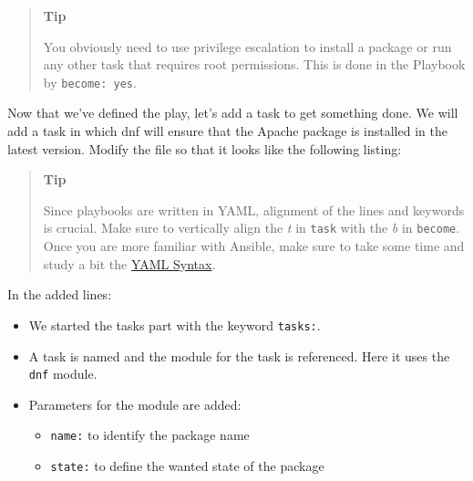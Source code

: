 \begin{quote}
\textbf{Tip}

You obviously need to use privilege escalation to install a package or
run any other task that requires root permissions. This is done in the
Playbook by \texttt{become:\ yes}.
\end{quote}

Now that we've defined the play, let's add a task to get something done.
We will add a task in which dnf will ensure that the Apache package is
installed in the latest version. Modify the file so that it looks like
the following listing:

\begin{Shaded}
\begin{Highlighting}[]
\PreprocessorTok{{-}{-}{-}}
\KeywordTok{{-}}\AttributeTok{ }\KeywordTok{:}
\AttributeTok{  }\KeywordTok{:}
\AttributeTok{  }\KeywordTok{:}\AttributeTok{ }
\AttributeTok{  }\KeywordTok{:}
\AttributeTok{    }\KeywordTok{{-}}\AttributeTok{ }\KeywordTok{:}
\AttributeTok{      }\KeywordTok{:}
\AttributeTok{        }\KeywordTok{:}
\end{Highlighting}
\end{Shaded}

\begin{quote}
\textbf{Tip}

Since playbooks are written in YAML, alignment of the lines and keywords
is crucial. Make sure to vertically align the \emph{t} in \texttt{task}
with the \emph{b} in \texttt{become}. Once you are more familiar with
Ansible, make sure to take some time and study a bit the
\href{https://docs.ansible.com/ansible/latest/reference_appendices/YAMLSyntax.html}{YAML
Syntax}.
\end{quote}

In the added lines:

\begin{itemize}
\tightlist
\item
  We started the tasks part with the keyword \texttt{tasks:}.
\item
  A task is named and the module for the task is referenced. Here it
  uses the \texttt{dnf} module.
\item
  Parameters for the module are added:

  \begin{itemize}
  \tightlist
  \item
    \texttt{name:} to identify the package name
  \item
    \texttt{state:} to define the wanted state of the package
  \end{itemize}
\end{itemize}

